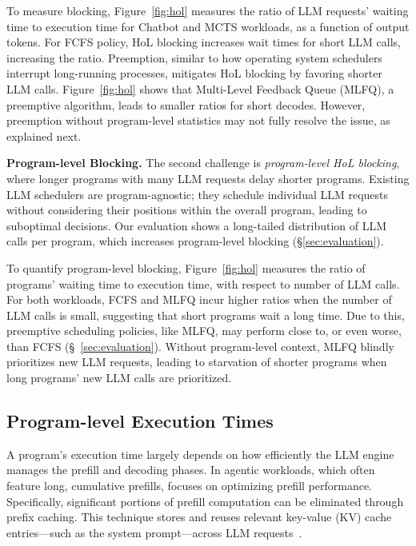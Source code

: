 To measure blocking, Figure~\ref{fig:hol} measures the ratio of LLM requests' waiting time to execution time for Chatbot and MCTS workloads, as a function of output tokens. For FCFS policy, HoL blocking increases wait times for short LLM calls, increasing the ratio. Preemption, similar to how operating system schedulers interrupt long-running processes, mitigates HoL blocking by favoring shorter LLM calls. Figure~\ref{fig:hol} shows that Multi-Level Feedback Queue (MLFQ), a preemptive algorithm, leads to smaller ratios for short decodes. However, preemption without program-level statistics may not fully resolve the issue, as explained next.

\vspace{2mm}
\noindent \textbf{Program-level Blocking.} The second challenge is \emph{program-level HoL blocking}, where longer programs with many LLM requests delay shorter programs. Existing LLM schedulers are program-agnostic; they schedule individual LLM requests without considering their positions within the overall program, leading to suboptimal decisions. Our evaluation  shows a long-tailed distribution of LLM calls per program, which increases program-level blocking (\S\ref{sec:evaluation}).

To quantify program-level blocking, Figure~\ref{fig:hol} measures the ratio of programs' waiting time to execution time, with respect to number of LLM calls. For both workloads, FCFS and MLFQ incur higher ratios when the number of LLM calls is small, suggesting that short programs wait a long time. Due to this, preemptive scheduling policies, like MLFQ, may perform close to, or even worse, than FCFS (\S~\ref{sec:evaluation}). Without program-level context, MLFQ blindly prioritizes new LLM requests, leading to starvation of shorter programs when long programs' new LLM calls are prioritized.

\subsection{Program-level Execution Times}
\label{sec:execution_times_reduce}

A program's execution time largely depends on how efficiently the LLM engine manages the prefill and decoding phases. In agentic workloads, which often feature long, cumulative prefills, \text{\name} focuses on optimizing prefill performance. Specifically, significant portions of prefill computation can be eliminated through prefix caching. This technique stores and reuses relevant key-value (KV) cache entries—such as the system prompt—across LLM requests~\cite{lin2024parrotefficientservingllmbased,zheng2024sglangefficientexecutionstructured}.

